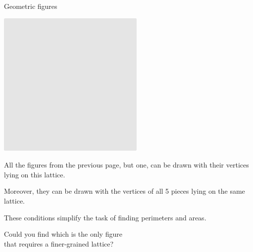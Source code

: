 \documentclass[14pt]{beamer}
\begin{document}

    \begin{frame}{Geometric figures}
        \begin{center}        
            \begin{minipage}{0.5\textwidth}%
                \centering \includegraphics[scale=0.70]{figures/figure022a.pdf}
            \end{minipage}\hfill\begin{minipage}{0.49\textwidth} \small
                All the figures from the previous page, but one, can be drawn with their vertices lying on this lattice.

                \bigskip

                Moreover, they can be drawn with the vertices of all 5 pieces lying on the same lattice.

                \bigskip

                These conditions simplify the task of finding perimeters and areas.
            \end{minipage}

            \bigskip \bigskip

            Could you find which is the only figure\\that requires a finer-grained lattice?
        \end{center}
        
    \end{frame}

\end{document}
